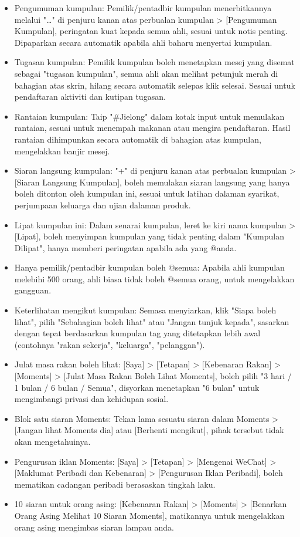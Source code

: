 \begin{itemize}
  \item Pengumuman kumpulan: Pemilik/pentadbir kumpulan menerbitkannya melalui "…" di penjuru kanan atas perbualan kumpulan > [Pengumuman Kumpulan], peringatan kuat kepada semua ahli, sesuai untuk notis penting. Dipaparkan secara automatik apabila ahli baharu menyertai kumpulan.
  \item Tugasan kumpulan: Pemilik kumpulan boleh menetapkan mesej yang disemat sebagai "tugasan kumpulan", semua ahli akan melihat petunjuk merah di bahagian atas skrin, hilang secara automatik selepas klik selesai. Sesuai untuk pendaftaran aktiviti dan kutipan tugasan.
  \item Rantaian kumpulan: Taip "\#Jielong" dalam kotak input untuk memulakan rantaian, sesuai untuk menempah makanan atau mengira pendaftaran. Hasil rantaian dihimpunkan secara automatik di bahagian atas kumpulan, mengelakkan banjir mesej.
  \item Siaran langsung kumpulan: "+" di penjuru kanan atas perbualan kumpulan > [Siaran Langsung Kumpulan], boleh memulakan siaran langsung yang hanya boleh ditonton oleh kumpulan ini, sesuai untuk latihan dalaman syarikat, perjumpaan keluarga dan ujian dalaman produk.
  \item Lipat kumpulan ini: Dalam senarai kumpulan, leret ke kiri nama kumpulan > [Lipat], boleh menyimpan kumpulan yang tidak penting dalam "Kumpulan Dilipat", hanya memberi peringatan apabila ada yang @anda.
  \item Hanya pemilik/pentadbir kumpulan boleh @semua: Apabila ahli kumpulan melebihi 500 orang, ahli biasa tidak boleh @semua orang, untuk mengelakkan gangguan.
\end{itemize}


\begin{itemize}
  \item Keterlihatan mengikut kumpulan: Semasa menyiarkan, klik "Siapa boleh lihat", pilih "Sebahagian boleh lihat" atau "Jangan tunjuk kepada", sasarkan dengan tepat berdasarkan kumpulan tag yang ditetapkan lebih awal (contohnya "rakan sekerja", "keluarga", "pelanggan").
  \item Julat masa rakan boleh lihat: [Saya] > [Tetapan] > [Kebenaran Rakan] > [Moments] > [Julat Masa Rakan Boleh Lihat Moments], boleh pilih "3 hari / 1 bulan / 6 bulan / Semua", disyorkan menetapkan "6 bulan" untuk mengimbangi privasi dan kehidupan sosial.
  \item Blok satu siaran Moments: Tekan lama sesuatu siaran dalam Moments > [Jangan lihat Moments dia] atau [Berhenti mengikut], pihak tersebut tidak akan mengetahuinya.
  \item Pengurusan iklan Moments: [Saya] > [Tetapan] > [Mengenai WeChat] > [Maklumat Peribadi dan Kebenaran] > [Pengurusan Iklan Peribadi], boleh mematikan cadangan peribadi berasaskan tingkah laku.
  \item 10 siaran untuk orang asing: [Kebenaran Rakan] > [Moments] > [Benarkan Orang Asing Melihat 10 Siaran Moments], matikannya untuk mengelakkan orang asing mengimbas siaran lampau anda.
\end{itemize}

